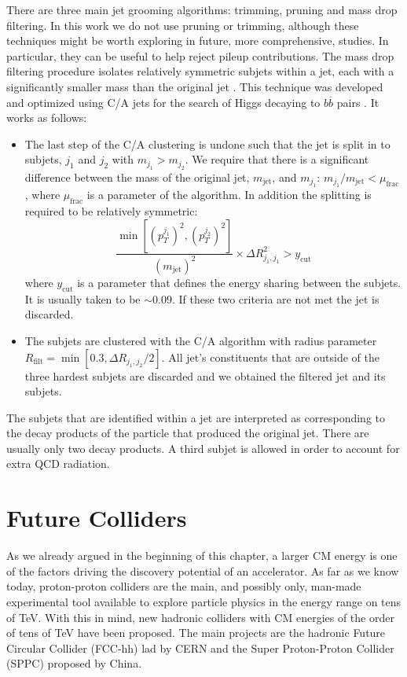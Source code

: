 There are three main jet grooming algorithms: trimming, pruning and mass drop filtering. In this work we do not use pruning or trimming, although these techniques might be worth exploring in future, more comprehensive, studies. In particular, they can be useful to help reject pileup contributions. The mass drop filtering procedure isolates relatively symmetric subjets within a jet, each with a significantly smaller mass than the original jet \cite{jetsub}. This technique was developed and optimized using C/A jets for the search of Higgs decaying to $b\overline{b}$ pairs \cite{BDRS}. It works as follows:
\begin{itemize}
	\item The last step of the C/A clustering is undone such that the jet is split in to subjets, $j_1$ and $j_2$ with $m_{j_1}>m_{j_2}$. We require that there is a significant difference between the mass of the original jet, $m_{\text{jet}}$, and $m_{j_1}$: $m_{j_1}/m_{\text{jet}} < \mu_{\text{frac}}$, where $\mu_{\text{frac}}$ is a parameter of the algorithm. In addition the splitting is required to be relatively symmetric:
	\begin{equation}
		\frac{\min[(p_T^{j_1})^2,(p_T^{j_2})^2]}{(m_{\text{jet}})^2} \times \Delta R_{j_1,j_1}^2 > y_{\text{cut}}
	\end{equation}
	where $y_{\text{cut}}$ is a parameter that defines the energy sharing between the subjets. It is usually taken to be $\sim 0.09$. If these two criteria are not met the jet is discarded.
	
	\item The subjets are clustered with the C/A algorithm with radius parameter $R_{\text{filt}}=\min[0.3,\Delta R_{j_1,j_2}/2]$. All jet's constituents that are outside of the three hardest subjets are discarded and we obtained the filtered jet and its subjets.
\end{itemize}

The subjets that are identified within a jet are interpreted as corresponding to the decay products of the particle that produced the original jet. There are usually only two decay products. A third subjet is allowed in order to account for extra QCD radiation.

\section{Future Colliders}
\label{section:future_colliders}

As we already argued in the beginning of this chapter, a larger CM energy is one of the factors driving the discovery potential of an accelerator. As far as we know today, proton-proton colliders are the main, and possibly only, man-made experimental tool available to explore particle physics in the energy range on tens of TeV. With this in mind, new hadronic colliders with CM energies of the order of tens of TeV have been proposed. The main projects are the hadronic Future Circular Collider (FCC-hh) lad by CERN and the Super Proton-Proton Collider (SPPC) proposed by China. 

